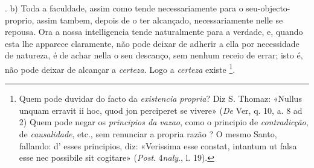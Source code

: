 . b) Toda a faculdade, assim como tende necessariamente para o seu-objecto-proprio, assim tambem, depois de o ter alcançado, necessariamente nelle se repousa. Ora a nossa intelligencia tende naturalmente para a verdade, e, quando esta lhe apparece claramente, não pode deixar de adherir a ella por necessidade de natureza, é de achar nella o seu descanço, sem nenhum receio de errar; isto é, não pode deixar de alcançar a \emph{certeza}. Logo a \emph{certeza} existe \footnote{Quem pode duvidar do facto da \emph{existencia propria}? Diz S. Thomaz: «Nullus unquam erravit ii hoc, quod jon perciperet se vivere» (\emph{De} Ver, q. 10, a. 8 ad 2) Quem pode negar os \emph{principios da vazao}, como o principio de \emph{contradicção}, de \emph{causalidade}, etc., sem renunciar a propria razão ? O mesmo Santo, fallando: d' esses principios, diz: «Verissima esse constat, intantum ut falsa esse nec possibile sit cogitare» (\emph{Post}. 4\emph{naly}., l. 19).}. \textbar{}

